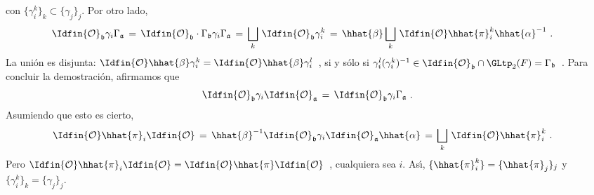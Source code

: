 %
con $\{\gamma_{i}^{k}\}_{k}\subset \{\gamma_{j}\}_{j}$. Por otro lado,
\begin{align*}
	\Idfin{\cal{O}}_{\frak{b}}\gamma_{i}\Gamma_{\frak{a}}
	& \,=\,\Idfin{\cal{O}}_{\frak{b}}\cdot
		\Gamma_{\frak{b}}\gamma_{i}\Gamma_{\frak{a}}
		\,=\,\bigsqcup_{k}\,\Idfin{\cal{O}}_{\frak{b}}
					\gamma_{i}^{k}
		\,=\,\hhat{\beta}\bigsqcup_{k}\,
			\Idfin{\cal{O}}\hhat{\pi}_{i}^{k}
				\hhat{\alpha}^{-1}
	\text{ .}
\end{align*}
%
La uni\'{o}n es disjunta:
\begin{math}
	\Idfin{\cal{O}}\hhat{\beta}\gamma_{i}^{k}=
		\Idfin{\cal{O}}\hhat{\beta}\gamma_{i}^{l}
\end{math}~,
si y s\'{o}lo si
\begin{math}
	\gamma_{i}^{l}(\gamma_{i}^{k})^{-1}\in
	\Idfin{\cal{O}}_{\frak{b}}\cap\GLtp_{2}(F)=\Gamma_{\frak{b}}
\end{math}~.
Para concluir la demostraci\'{o}n, afirmamos que
\begin{equation}
	\label{eq:coclasedoblelocalglobal}
	\Idfin{\cal{O}}_{\frak{b}}\gamma_{i}\Idfin{\cal{O}}_{\frak{a}}
	\,=\,\Idfin{\cal{O}}_{\frak{b}}\gamma_{i}\Gamma_{\frak{a}}
	\text{ .}
\end{equation}
%
Asumiendo que esto es cierto,
\begin{align*}
	\Idfin{\cal{O}}\hhat{\pi}_{i}\Idfin{\cal{O}}
	& \,=\,\hhat{\beta}^{-1}\Idfin{\cal{O}}_{\frak{b}}\gamma_{i}
			\Idfin{\cal{O}}_{\frak{a}}\hhat{\alpha}
		\,=\,\bigsqcup_{k}\,\Idfin{\cal{O}}\hhat{\pi}_{i}^{k}
	\text{ .}
\end{align*}
%
Pero
\begin{math}
	\Idfin{\cal{O}}\hhat{\pi}_{i}\Idfin{\cal{O}}=
	\Idfin{\cal{O}}\hhat{\pi}\Idfin{\cal{O}}
\end{math}~,
cualquiera sea $i$. As\'{\i}, $\{\hhat{\pi}_{i}^{k}\}=\{\hhat{\pi}_{j}\}_{j}$ y
$\{\gamma_{i}^{k}\}_{k}=\{\gamma_{j}\}_{j}$.

